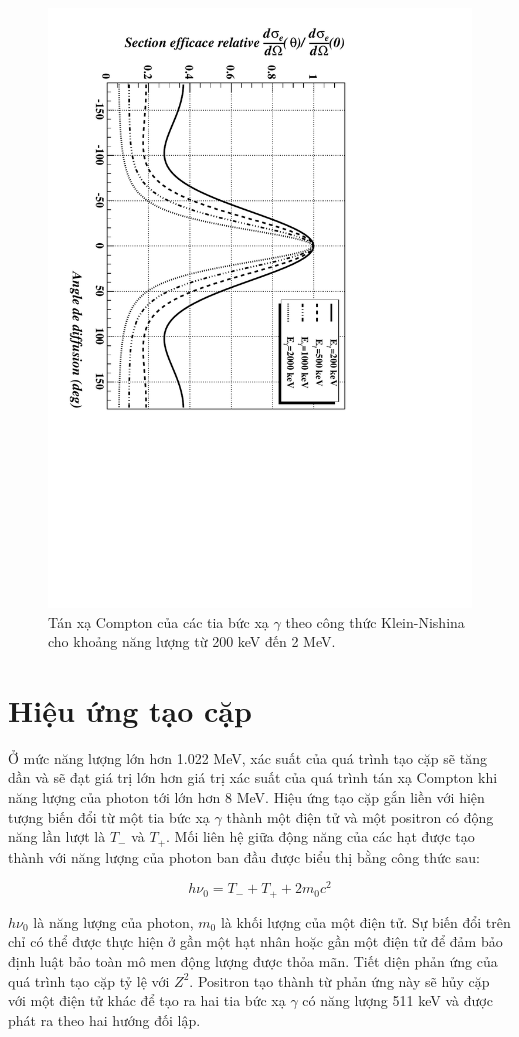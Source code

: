 \begin{figure}[!h]
\centering
\includegraphics[height=0.8\textwidth,angle = 90.0 ]{figure/fig_cosolythuyet/klein.pdf}
\caption{Tán xạ Compton của các tia bức xạ $\gamma$ theo công thức Klein-Nishina cho khoảng năng lượng từ 200 keV đến 2 MeV.}
\label{fig:klein}
\end{figure}

\section{Hiệu ứng tạo cặp}

Ở mức năng lượng lớn hơn 1.022 MeV, xác suất của quá trình tạo cặp sẽ tăng dần và sẽ đạt giá trị lớn hơn giá trị xác suất của quá trình tán xạ Compton khi năng lượng của photon tới lớn hơn 8 MeV. Hiệu ứng tạo cặp gắn liền với hiện tượng biến đổi từ một tia bức xạ $\gamma$ thành một 		điện tử và một positron có động năng lần lượt là $T_{-}$ và $T_{+}$. Mối liên hệ giữa động năng của các hạt được tạo thành với năng lượng của photon ban đầu được biểu thị bằng công thức sau:

\begin{equation}
	h\nu_{0} = T_{-} + T_{+} + 2m_{0}c^{2}
\end{equation}

$h\nu_{0}$ là năng lượng của photon, $m_{0}$ là khối lượng của một điện tử. Sự biến đổi trên chỉ có thể được thực hiện ở gần một hạt nhân hoặc gần một điện tử để đảm bảo 	  định luật bảo toàn mô men động lượng được thỏa mãn. Tiết diện phản ứng của quá trình tạo cặp tỷ lệ với $Z^{2}$. Positron tạo thành từ phản ứng này sẽ hủy cặp với một điện tử khác để tạo ra hai tia bức xạ $\gamma$ có năng lượng 511 keV và được phát ra theo hai hướng đối lập.